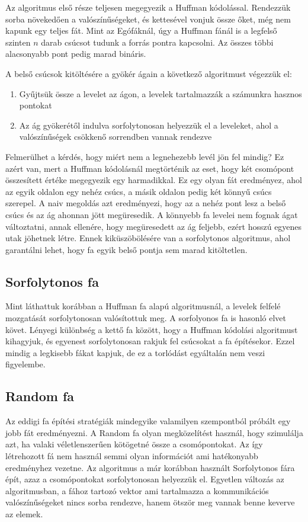 \documentclass[12pt]{report}
\begin{document}
Az algoritmus első része teljesen megegyezik a Huffman kódolással.
Rendezzük sorba növekedően a valószínűségeket, és kettesével vonjuk össze őket, még nem kapunk egy teljes fát.
Mint az Egófáknál, úgy a Huffman fánál is a legfelső szinten \(n\) darab csúcsot tudunk a forrás pontra kapcsolni.
Az összes többi alacsonyabb pont pedig marad bináris.

A belső csúcsok kitöltésére a gyökér ágain a következő algoritmust végezzük el:
\begin{enumerate}
	\item Gyűjtsük össze a levelet az ágon, a levelek tartalmazzák a számunkra hasznos pontokat 
	\item Az ág gyökerétől indulva sorfolytonosan helyezzük el a leveleket, ahol a valószínűségek csökkenő sorrendben vannak rendezve
\end{enumerate}

Felmerülhet a kérdés, hogy miért nem a legnehezebb levél jön fel mindig?
Ez azért van, mert a Huffman kódolásnál megtörténik az eset, hogy két csomópont összesített értéke megegyezik egy harmadikkal.
Ez egy olyan fát eredményez, ahol az egyik oldalon egy nehéz csúcs, a másik oldalon pedig két könnyű csúcs szerepel.
A naiv megoldás azt eredményezi, hogy az a nehéz pont lesz a belső csúcs és az ág ahonnan jött megüresedik.
A könnyebb fa levelei nem fognak ágat változtatni, annak ellenére, hogy megüresedett az ág feljebb, ezért hosszú egyenes utak jöhetnek létre.
Ennek kiküszöbölésére van a sorfolytonos algoritmus, ahol garantálni lehet, hogy fa egyik belső pontja sem marad kitöltetlen.

\subsection{Sorfolytonos fa}

Mint láthattuk korábban a Huffman fa alapú algoritmusnál, a levelek felfelé mozgatását sorfolytonosan valósítottuk meg. A sorfolyonos fa is hasonló elvet követ.
Lényegi különbség a kettő fa között, hogy a Huffman kódolási algoritmust kihagyjuk, és egyenest sorfolytonosan rakjuk fel csúcsokat a fa építésekor.
Ezzel mindig a legkisebb fákat kapjuk, de ez a torlódást egyáltalán nem veszi figyelembe.

\subsection{Random fa}

Az eddigi fa építési stratégiák mindegyike valamilyen szempontból próbált egy jobb fát eredményezni.
A Random fa olyan megközelítést használ, hogy szimulálja azt, ha valaki véletlenszerűen kötögetné össze a csomópontokat.
Az így létrehozott fá nem használ semmi olyan információt ami hatékonyabb eredményhez vezetne.
Az algoritmus a már korábban használt Sorfolytonos fára épít, azaz a csomópontokat sorfolytonosan helyezzük el.
Egyetlen változás az algoritmusban, a fához tartozó vektor ami tartalmazza a kommunikációs valószínűségeket nincs sorba rendezve, hanem ötször meg vannak benne keverve az elemek. 
\end{document}

